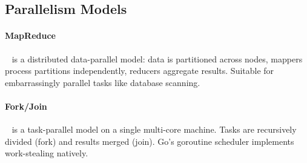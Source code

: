 \subsection{Parallelism Models}

\paragraph{MapReduce}~\cite{ref_mapreduce} is a distributed data-parallel model: data is partitioned across nodes, mappers process partitions independently, reducers aggregate results. Suitable for embarrassingly parallel tasks like database scanning.

\paragraph{Fork/Join}~\cite{ref_forkjoin} is a task-parallel model on a single multi-core machine. Tasks are recursively divided (fork) and results merged (join). Go's goroutine scheduler implements work-stealing natively.

